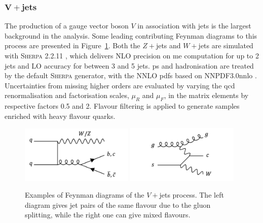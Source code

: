 \subsubsection{$\boldsymbol{V+}$jets}
The production of a gauge vector boson $V$ in association with jets is the largest background in the analysis. Some leading contributing Feynman diagrams to this process are presented in Figure~\ref{fig:feynVJ}. Both the $Z+$jets and $W+$jets are simulated with \textsc{Sherpa} 2.2.11 \cite{10.21468/SciPostPhys.7.3.034}, which delivers NLO precision on \gls{me} computation for up to 2 jets and LO accuracy for between 3 and 5 jets. \gls{ps} and hadronisation are treated by the default \textsc{Sherpa} generator, with the NNLO \glspl{pdf} based on NNPDF3.0nnlo \cite{PDFLHCrun2}. Uncertainties from missing higher orders are evaluated by varying the \gls{qcd} renormalisation and factorisation scales, $\mu_R$ and $\mu_F$, in the matrix elements by respective factors 0.5 and 2. Flavour filtering is applied to generate samples enriched with heavy flavour quarks.

\begin{figure}[h!]
  \center
  \includegraphics[width=0.48\textwidth]{Images/VH/Feynman/vjet.png}
  \includegraphics[width=0.48\textwidth]{Images/VH/Feynman/vjet2.png}
  \caption{Examples of Feynman diagrams of the $V+$jets process. The left diagram gives jet pairs of the same flavour due to the gluon splitting, while the right one can give mixed flavours.} 
  \label{fig:feynVJ}
\end{figure}

